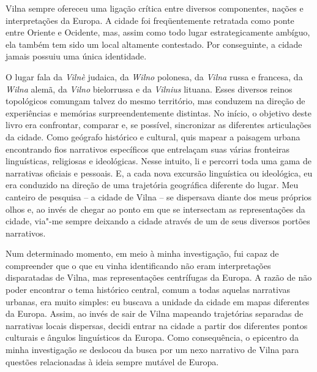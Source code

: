 Vilna sempre ofereceu uma ligação crítica entre diversos componentes,
nações e interpretações da Europa. A cidade foi freqüentemente retratada
como ponte entre Oriente e Ocidente, mas, assim como todo lugar
estrategicamente ambíguo, ela também tem sido um local altamente
contestado. Por conseguinte, a cidade jamais possuiu uma única
identidade. 

O lugar fala da \textit{Vilnè} judaica, da \textit{Wilno}
polonesa, da \textit{Vilna} russa e francesa, da \textit{Wilna} alemã, da
\textit{Vilno} bielorrussa e da \textit{Vilnius} lituana. Esses diversos
reinos topológicos comungam talvez do mesmo território, mas conduzem na
direção de experiências e memórias surpreendentemente distintas. No
início, o objetivo deste livro era confrontar, comparar e, se possível,
sincronizar as diferentes articulações da cidade. Como geógrafo
histórico e cultural, quis mapear a paisagem urbana encontrando fios
narrativos específicos que entrelaçam suas várias fronteiras
linguísticas, religiosas e ideológicas. Nesse intuito, li e percorri
toda uma gama de narrativas oficiais e pessoais. E, a cada nova excursão
linguística ou ideológica, eu era conduzido na direção de uma trajetória
geográfica diferente do lugar. Meu canteiro de pesquisa -- a cidade de
Vilna -- se dispersava diante dos meus próprios olhos e, ao invés de
chegar ao ponto em que se intersectam as representações da cidade,
via"-me sempre deixando a cidade através de um de seus diversos portões
narrativos.

Num determinado momento, em meio à minha investigação, fui capaz de
compreender que o que eu vinha identificando não eram interpretações
disparatadas de Vilna, mas representações centrífugas da Europa. A razão
de não poder encontrar o tema histórico central, comum a todas aquelas
narrativas urbanas, era muito simples: eu buscava a unidade da cidade em
mapas diferentes da Europa. Assim, ao invés de sair de Vilna mapeando
trajetórias separadas de narrativas locais dispersas, decidi entrar na
cidade a partir dos diferentes pontos culturais e ângulos linguísticos
da Europa. Como consequência, o epicentro da minha investigação se
deslocou da busca por um nexo narrativo de Vilna para questões
relacionadas à ideia sempre mutável de Europa.

